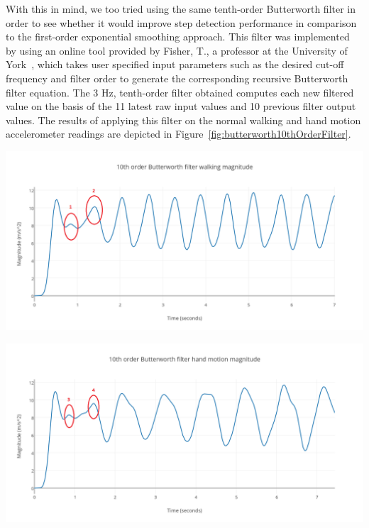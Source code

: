 \documentclass[12pt,a4paper]{report}
\begin{document}
With this in mind, we too tried using the same tenth-order Butterworth filter in order to see whether it would improve step detection performance in comparison to the first-order exponential smoothing approach. This filter was implemented by using an online tool provided by Fisher, T., a professor at the University of York~\cite{filterTool}, which takes user specified input parameters such as the desired cut-off frequency and filter order to generate the corresponding recursive Butterworth filter equation. The 3 Hz, tenth-order filter obtained computes each new filtered value on the basis of the 11 latest raw input values and 10 previous filter output values. The results of applying this filter on the normal walking and hand motion accelerometer readings are depicted in Figure~\ref{fig:butterworth10thOrderFilter}. 
\begin{center}
  \begin{minipage}[b]{0.5\textwidth}
    \includegraphics[scale=0.2]{images/butterworth10thOrderFilterWalkingMagnitude.png}
  \end{minipage}%
  \begin{minipage}[b]{0.5\textwidth}
    \includegraphics[scale=0.2]{images/butterworth10thOrderFilterHandMotionMagnitude.png}
\end{minipage}
\label{fig:butterworth10thOrderFilter}
\end{center}
\end{document}
